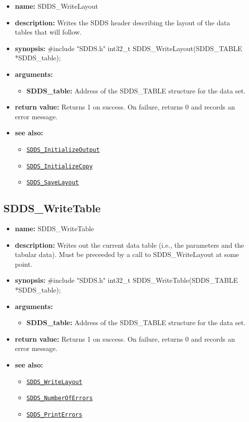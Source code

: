 \documentclass[11pt]{article}
\newcommand{\progref}[1]{\hyperref[SDDS_#1]{\tt SDDS\_#1}}
\begin{document}
\begin{itemize}
\item {\bf name:}\newline
SDDS\_WriteLayout
\item {\bf description:}\newline
Writes the SDDS header describing the layout of the data tables that will follow.
\item {\bf synopsis:} \#include "SDDS.h"\newline
int32\_t SDDS\_WriteLayout(SDDS\_TABLE *SDDS\_table);
\item {\bf arguments:}
\begin{itemize}
\item {\bf SDDS\_table:} Address of the SDDS\_TABLE structure for the data set.
\end{itemize}
\item {\bf return value:}\newline
Returns 1 on success. On failure, returns 0 and records an error message.
\item {\bf see also:}
\begin{itemize}
\item \progref{InitializeOutput}
\item \progref{InitializeCopy}
\item \progref{SaveLayout}
\end{itemize}
\end{itemize}

\subsection{SDDS\_WriteTable}
\label{SDDS_WriteTable}

\begin{itemize}
\item {\bf name:}\newline
SDDS\_WriteTable
\item {\bf description:}\newline
Writes out the current data table (i.e., the parameters and the tabular data). Must be preceeded by a call to SDDS\_WriteLayout at some point.
\item {\bf synopsis:} \#include "SDDS.h"\newline
int32\_t SDDS\_WriteTable(SDDS\_TABLE *SDDS\_table);
\item {\bf arguments:}
\begin{itemize}
\item {\bf SDDS\_table:} Address of the SDDS\_TABLE structure for the data set.
\end{itemize}
\item {\bf return value:}\newline
Returns 1 on success. On failure, returns 0 and records an error message.
\item {\bf see also:}
\begin{itemize}
\item \progref{WriteLayout}
\item \progref{NumberOfErrors}
\item \progref{PrintErrors}
\end{itemize}
\end{itemize}

\tableofcontents
\end{document}
